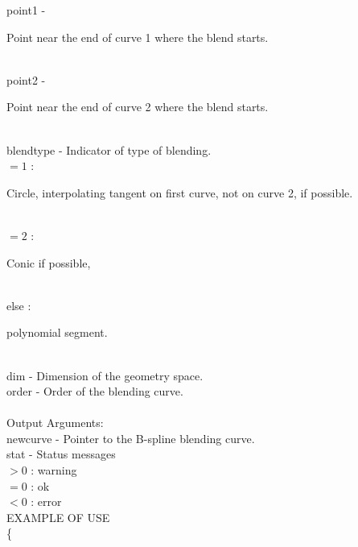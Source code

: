         \>\>    {\fov point1}   \> - \> \begin{minipg2}
                        Point near the end of curve 1 where the blend starts.
                                \end{minipg2}\\
        \>\>    {\fov point2}   \> - \> \begin{minipg2}
                        Point near the end of curve 2 where the blend starts.
                                \end{minipg2}\\
        \>\>    {\fov blendtype}\> - \> Indicator of type of blending.\\
                \>\>\>\>\>      $=1$ : \>\begin{minipg5}
                                Circle, interpolating tangent on first
                                curve, not on curve 2, if possible.
                                \end{minipg5}\\[0.3ex]
                \>\>\>\>\>      $=2$ : \>\begin{minipg5}
                                Conic if possible,
                                \end{minipg5}\\
                \>\>\>\>\>      else : \>\begin{minipg5}
                                polynomial segment.
                                \end{minipg5}\\
        \>\>    {\fov dim}      \> - \> Dimension of the geometry space.\\
        \>\>    {\fov order}    \> - \> Order of the blending curve.\\
\\
        \>Output Arguments:\\
        \>\>    {\fov newcurve}\> - \> Pointer to the B-spline blending curve.\\
        \>\>    {\fov stat}     \> - \> Status messages\\
                \>\>\>\>\>              $> 0$   : warning\\
                \>\>\>\>\>              $= 0$   : ok\\
                \>\>\>\>\>              $< 0$   : error\\
\newpagetabs
EXAMPLE OF USE\\
                \>      \{ \\
